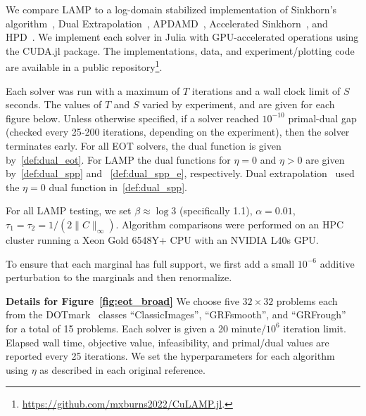 \documentclass[10pt]{article}
\theoremstyle{plain}
\theoremstyle{definition}
\theoremstyle{remark}
\begin{document}
We compare LAMP to a log-domain stabilized implementation of Sinkhorn's algorithm~\cite{sinkhornConcerningNonnegativeMatrices1967,altschulerNearlinearTimeApproximation2017,schmitzerStabilizedSparseScaling2019a}, Dual Extrapolation~\cite{jambulapatiDirectTildelbraceOrbrace2019a}, APDAMD~\cite{linEfficiencyEntropicRegularized2022}, Accelerated Sinkhorn~\cite{linEfficiencyEntropicRegularized2022}, and HPD~\cite{chambolleAcceleratedBregmanPrimalDual2022}. We implement each solver in Julia with GPU-accelerated operations using the CUDA.jl package. The implementations, data, and experiment/plotting code are available in a public repository\footnote{\href{https://github.com/mxburns2022/CuLAMP.jl}{https://github.com/mxburns2022/CuLAMP.jl}.}.



Each solver was run with a maximum of $T$ iterations and a wall clock limit of $S$ seconds. The values of $T$ and $S$ varied by experiment, and are given for each figure below. Unless otherwise specified, if a solver reached $10^{-10}$ primal-dual gap (checked every 25-200 iterations, depending on the experiment), then the solver terminates early. For all EOT solvers, the dual function is given by~\eqref{def:dual_eot}. For LAMP the dual functions for $\eta =0$ and $\eta >0$ are given by~\eqref{def:dual_spp} and ~\eqref{def:dual_spp_e}, respectively. Dual extrapolation~\cite{jambulapatiDirectTildelbraceOrbrace2019a} used the $\eta =0$ dual function in~\eqref{def:dual_spp}. 

For all LAMP testing, we set $\beta\approx\log 3$ (specifically 1.1), $\alpha=0.01$, $\tau_1=\tau_2=1/(2\|C\|_\infty)$. Algorithm comparisons were performed on an HPC cluster running a Xeon Gold 6548Y+ CPU with an NVIDIA L40s GPU. 

To ensure that each marginal has full support, we first add a small $10^{-6}$ additive perturbation to the marginals and then renormalize.
 


\vspace{1em}\noindent\textbf{Details for Figure~\ref{fig:eot_broad}}
We choose five $32\times 32$ problems each from the DOTmark~\cite{schrieberDOTmarkBenchmarkDiscrete2017} classes ``ClassicImages'', ``GRFsmooth'', and ``GRFrough'' for a total of 15 problems. Each solver is given a 20 minute/$10^6$ iteration limit. Elapsed wall time, objective value, infeasibility, and primal/dual values are reported every 25 iterations. We set the hyperparameters for each algorithm using $\eta$ as described in each original reference.
\end{document}
